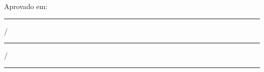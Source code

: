 \documentclass[
  12pt,
  a4paper,
  oneside,
  openany
]{abntex2}
\renewcommand{\bibname}{Referências}%
\begin{document}
\renewcommand{\bibname}{Referências}
\hypersetup{pageanchor=false}
\pretextual
\imprimircapa
\imprimirfolhaderosto*


\begin{folhadeaprovacao}
  \begin{center}
    \ABNTEXchapterfont\large\imprimirautor

    \vspace*{\fill}
    \begin{minipage}{0.8\textwidth}
      \begin{center}
        \ABNTEXchapterfont\bfseries\imprimirtitulo
      \end{center}
      \imprimirpreambulo
    \end{minipage}
    \vspace*{\fill}

    Aprovado em: \rule{2.5cm}{0.4pt}/\rule{2.5cm}{0.4pt}/\rule{2.5cm}{0.4pt}
  \end{center}

  \vspace*{\fill}
  \begin{center}
    \imprimirlocal
    \par
    \imprimirdata
  \end{center}
\end{folhadeaprovacao}

\end{document}

